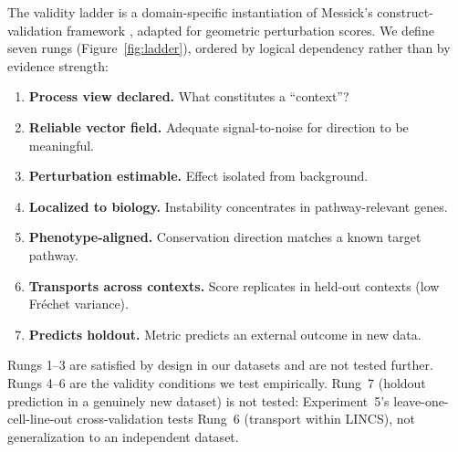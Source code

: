 \documentclass[11pt]{article}
\begin{document}
The validity ladder is a domain-specific instantiation of Messick's
construct-validation framework \citep{messick1995validity}, adapted for
geometric perturbation scores. We define seven rungs
(Figure~\ref{fig:ladder}), ordered by logical dependency rather than by
evidence strength:

\begin{enumerate}
  \item \textbf{Process view declared.} What constitutes a ``context''?
  \item \textbf{Reliable vector field.} Adequate signal-to-noise for
    direction to be meaningful.
  \item \textbf{Perturbation estimable.} Effect isolated from background.
  \item \textbf{Localized to biology.} Instability concentrates in
    pathway-relevant genes.
  \item \textbf{Phenotype-aligned.} Conservation direction matches a
    known target pathway.
  \item \textbf{Transports across contexts.} Score replicates in held-out
    contexts (low Fr\'echet variance).
  \item \textbf{Predicts holdout.} Metric predicts an external outcome
    in new data.
\end{enumerate}

Rungs 1--3 are satisfied by design in our datasets and are not tested
further. Rungs 4--6 are the validity conditions we test empirically.
Rung~7 (holdout prediction in a genuinely new dataset) is not tested:
Experiment~5's leave-one-cell-line-out cross-validation tests Rung~6
(transport within LINCS), not generalization to an independent dataset.
\end{document}
